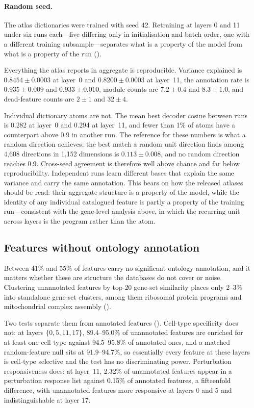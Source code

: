 \paragraph{Random seed.} The atlas dictionaries were trained with seed 42. Retraining at layers 0
and 11 under six runs each---five differing only in initialisation and batch order, one with a
different training subsample---separates what is a property of the model from what is a property of
the run ().

Everything the atlas reports in aggregate is reproducible. Variance explained is
$0.8454 \pm 0.0003$ at layer~0 and $0.8200 \pm 0.0003$ at layer~11, the annotation rate is
$0.935 \pm 0.009$ and $0.933 \pm 0.010$, module counts are $7.2 \pm 0.4$ and $8.3 \pm 1.0$, and
dead-feature counts are $2 \pm 1$ and $32 \pm 4$.

Individual dictionary atoms are not. The mean best decoder cosine between runs is 0.282 at layer~0
and 0.294 at layer~11, and fewer than 1\% of atoms have a counterpart above 0.9 in another run. The
reference for these numbers is what a random direction achieves: the best match a random unit
direction finds among 4,608 directions in 1,152 dimensions is $0.113 \pm 0.008$, and no random
direction reaches 0.9. Cross-seed agreement is therefore well above chance and far below
reproducibility. Independent runs learn different bases that explain the same variance and carry the
same annotation. This bears on how the released atlases should be read: their aggregate structure
is a property of the model, while the identity of any individual catalogued feature is partly a
property of the training run---consistent with the gene-level analysis above, in which the recurring
unit across layers is the program rather than the atom.

\subsection*{Features without ontology annotation}
\label{sec:unannotated}

Between 41\% and 55\% of features carry no significant ontology annotation, and it matters whether
these are structure the databases do not cover or noise. Clustering unannotated features by
top-20 gene-set similarity places only 2--3\% into standalone gene-set clusters, among them
ribosomal protein programs and mitochondrial complex assembly ().

Two tests separate them from annotated features (). Cell-type specificity
does not: at layers $\{0, 5, 11, 17\}$, 89.4--95.0\% of unannotated features are enriched for at
least one cell type against 94.5--95.8\% of annotated ones, and a matched random-feature null sits
at 91.9--94.7\%, so essentially every feature at these layers is cell-type selective and the test
has no discriminating power. Perturbation responsiveness does: at layer~11, 2.32\% of unannotated
features appear in a perturbation response list against 0.15\% of annotated features, a fifteenfold
difference, with unannotated features more responsive at layers 0 and 5 and indistinguishable at layer 17.

